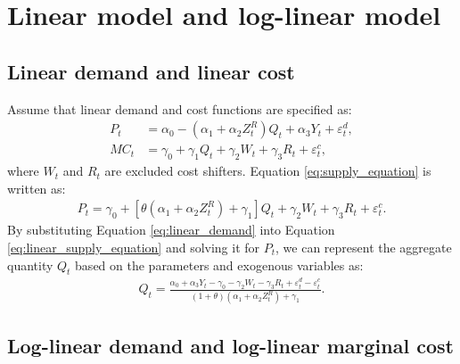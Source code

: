 \documentclass[11pt, a4paper]{article}
\begin{document}

\section{Linear model and log-linear model}

\subsection{Linear demand and linear cost}
Assume that linear demand and cost functions are specified as:
\begin{align}
    P_t &= \alpha_0 - (\alpha_1 + \alpha_2Z^{R}_{t})Q_t + \alpha_3 Y_t + \varepsilon^{d}_{t},\label{eq:linear_demand}\\
    MC_t &= \gamma_0  + \gamma_1 Q_{t} + \gamma_2 W_{t} + \gamma_3 R_t + \varepsilon^{c}_{t},\label{eq:linear_marginal_cost}
\end{align}
where $W_{t}$ and $R_t$ are excluded cost shifters. Equation \eqref{eq:supply_equation} is written as:
\begin{align}
    P_t = \gamma_0 + [\theta(\alpha_1 + \alpha_2Z^{R}_{t})+ \gamma_1] Q_t   + \gamma_2 W_{t} + \gamma_3 R_t + \varepsilon^{c}_{t}.\label{eq:linear_supply_equation}
\end{align}
By substituting Equation \eqref{eq:linear_demand} into Equation \eqref{eq:linear_supply_equation} and solving it for $P_t$, we can represent the aggregate quantity $Q_t$ based on the parameters and exogenous variables as:
\begin{align}
    Q_t =  \frac{\alpha_0 + \alpha_3 Y_t - \gamma_0 - \gamma_2 W_{t} - \gamma_3 R_t + \varepsilon^{d}_{t} - \varepsilon^{c}_{t}}{(1 + \theta) (\alpha_1 + \alpha_2 Z^{R}_{t}) + \gamma_1}.\label{eq:quantity_linear}
\end{align}


\subsection{Log-linear demand and log-linear marginal cost}
\end{document}
